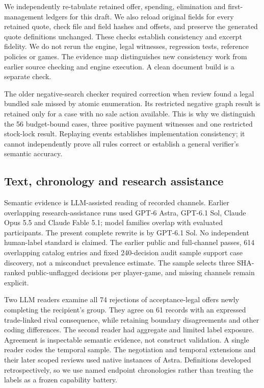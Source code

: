 \documentclass[11pt,letterpaper]{article}
\begin{document}
We independently re-tabulate retained offer, spending, elimination and first-management ledgers for this draft. We also reload original fields for every retained quote, check file and field hashes and offsets, and preserve the generated quote definitions unchanged. These checks establish consistency and excerpt fidelity. We do not rerun the engine, legal witnesses, regression tests, reference policies or games. The evidence map distinguishes new consistency work from earlier source checking and engine execution. A clean document build is a separate check.

The older negative-search checker required correction when review found a legal bundled sale missed by atomic enumeration. Its restricted negative graph result is retained only for a case with no sale action available. This is why we distinguish the 56 budget-bound cases, three positive payment witnesses and one restricted stock-lock result. Replaying events establishes implementation consistency; it cannot independently prove all rules correct or establish a general verifier's semantic accuracy.

\subsection{Text, chronology and research assistance}

Semantic evidence is LLM-assisted reading of recorded channels. Earlier overlapping research-assistance runs used GPT-6 Astra, GPT-6.1 Sol, Claude Opus 5.5 and Claude Fable 5.1; model families overlap with evaluated participants. The present complete rewrite is by GPT-6.1 Sol. No independent human-label standard is claimed. The earlier public and full-channel passes, 614 overlapping catalog entries and fixed 240-decision audit sample support case discovery, not a misconduct prevalence estimate. The sample selects three SHA-ranked public-unflagged decisions per player-game, and missing channels remain explicit.

Two LLM readers examine all 74 rejections of acceptance-legal offers newly completing the recipient's group. They agree on 61 records with an expressed trade-linked rival consequence, while retaining boundary disagreements and other coding differences. The second reader had aggregate and limited label exposure. Agreement is inspectable semantic evidence, not construct validation. A single reader codes the temporal sample. The negotiation and temporal extensions and their later scoped reviews used native instances of Astra. Definitions developed retrospectively, so we use named endpoint chronologies rather than treating the labels as a frozen capability battery.
\end{document}
